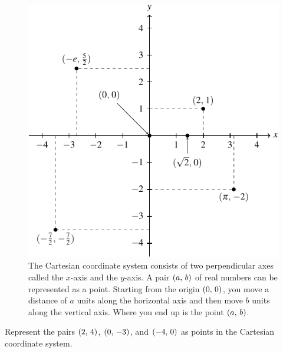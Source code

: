\documentclass[a4paper,oneside,12pt]{article}
\begin{document}
\begin{figure}[!htbp]
\centering
\includegraphics[scale=1.1]{image/03/cartesian-coordinate.pdf}
\caption{%
  The Cartesian coordinate system consists of two perpendicular axes
  called the $x$-axis and the $y$-axis.  A pair $\left\lparen{a},\, {b}\right\rparen$ of real
  numbers can be represented as a point.  Starting from the origin
  $\left\lparen{0},\, {0}\right\rparen$, you move a distance of $a$ units along the
  horizontal axis and then move $b$ units along the vertical axis.
  Where you end up is the point $\left\lparen{a},\, {b}\right\rparen$.
}
\label{fig:Cartesian_coordinate_system}
\end{figure}

\begin{exercise}
Represent the pairs $\left\lparen{2},\, {4}\right\rparen$, $\left\lparen{0},\, {-3}\right\rparen$, and
$\left\lparen{-4},\, {0}\right\rparen$ as points in the Cartesian coordinate system.
\end{exercise}
\end{document}
